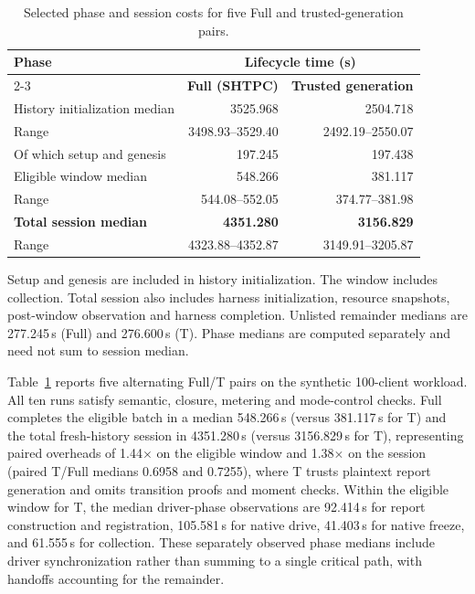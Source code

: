 \documentclass[conference,compsoc]{IEEEtran}
\theoremstyle{definition}
\numberwithin{equation}{section}
\numberwithin{table}{section}
\numberwithin{figure}{section}
\theoremstyle{plain}
\begin{document}
\begin{table}[t]
\centering
\caption{Selected phase and session costs for five Full and trusted-generation pairs.}
\label{tab:session-cost}
\footnotesize
\setlength{\tabcolsep}{2pt}
\renewcommand{\arraystretch}{1.08}
\begin{tabular}{@{}lrr@{}}
\toprule
\multirow{2}{*}{\textbf{Phase}} & \multicolumn{2}{c}{\textbf{Lifecycle time (s)}} \\
\cmidrule(lr){2-3}
 & \textbf{Full (SHTPC)} & \textbf{Trusted generation} \\
\midrule
History initialization median & 3525.968 & 2504.718 \\
\quad Range & 3498.93--3529.40 & 2492.19--2550.07 \\
\quad Of which setup and genesis & 197.245 & 197.438 \\
Eligible window median & 548.266 & 381.117 \\
\quad Range & 544.08--552.05 & 374.77--381.98 \\
\midrule
\rowcolor{black!5} \textbf{Total session median} & \textbf{4351.280} & \textbf{3156.829} \\
\quad Range & 4323.88--4352.87 & 3149.91--3205.87 \\
\bottomrule
\end{tabular}
\par\smallskip\raggedright Setup and genesis are included in history initialization. The window includes collection. Total session also includes harness initialization, resource snapshots, post-window observation and harness completion. Unlisted remainder medians are 277.245\,s (Full) and 276.600\,s (T). Phase medians are computed separately and need not sum to session median.
\end{table}

Table~\ref{tab:session-cost} reports five alternating Full/T pairs on the synthetic 100-client workload. All ten runs satisfy semantic, closure, metering and mode-control checks. Full completes the eligible batch in a median 548.266\,s (versus 381.117\,s for T) and the total fresh-history session in 4351.280\,s (versus 3156.829\,s for T), representing paired overheads of 1.44$\times$ on the eligible window and 1.38$\times$ on the session (paired T/Full medians 0.6958 and 0.7255), where T trusts plaintext report generation and omits transition proofs and moment checks. Within the eligible window for T, the median driver-phase observations are 92.414\,s for report construction and registration, 105.581\,s for native drive, 41.403\,s for native freeze, and 61.555\,s for collection. These separately observed phase medians include driver synchronization rather than summing to a single critical path, with handoffs accounting for the remainder.
\end{document}
